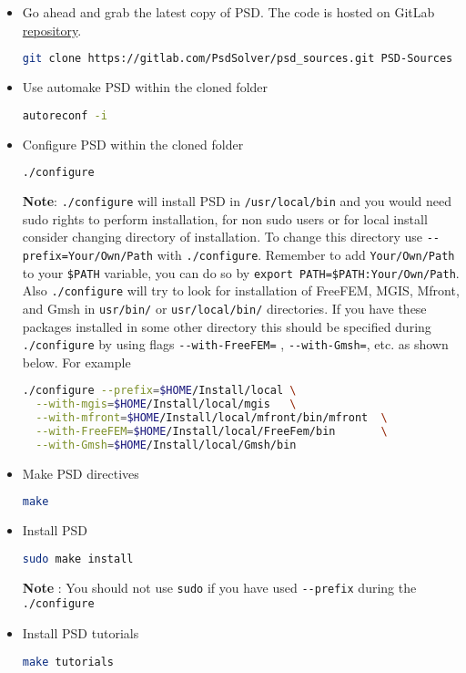\begin{itemize}
\item
  Go ahead and grab the latest copy of PSD. The code is hosted on GitLab
  \href{https://gitlab.com/PsdSolver/psd_sources}{repository}.

\begin{lstlisting}[language=bash]
git clone https://gitlab.com/PsdSolver/psd_sources.git PSD-Sources
\end{lstlisting}
\item
  Use automake PSD within the cloned folder

\begin{lstlisting}[language=bash]
autoreconf -i
\end{lstlisting}
\item
  Configure PSD within the cloned folder

\begin{lstlisting}[language=bash]
./configure
\end{lstlisting}

  \textbf{Note}: \lstinline!./configure! will install PSD in
  \lstinline!/usr/local/bin! and you would need sudo rights to perform
  installation, for non sudo users or for local install consider
  changing directory of installation. To change this directory use
  \lstinline!--prefix=Your/Own/Path! with \lstinline!./configure!.
  Remember to add \lstinline!Your/Own/Path! to your \lstinline!$PATH!
  variable, you can do so by
  \lstinline!export PATH=$PATH:Your/Own/Path!. Also
  \lstinline!./configure! will try to look for installation of FreeFEM,
  MGIS, Mfront, and Gmsh in \lstinline!usr/bin/! or
  \lstinline!usr/local/bin/! directories. If you have these packages
  installed in some other directory this should be specified during
  \lstinline!./configure! by using flags \lstinline!--with-FreeFEM=! ,
  \lstinline!--with-Gmsh=!, etc. as shown below. For example

\begin{lstlisting}[language=bash]
./configure --prefix=$HOME/Install/local \
  --with-mgis=$HOME/Install/local/mgis   \
  --with-mfront=$HOME/Install/local/mfront/bin/mfront  \
  --with-FreeFEM=$HOME/Install/local/FreeFem/bin       \
  --with-Gmsh=$HOME/Install/local/Gmsh/bin        
\end{lstlisting}
\item
  Make PSD directives

\begin{lstlisting}[language=bash]
make
\end{lstlisting}
\item
  Install PSD

\begin{lstlisting}[language=bash]
sudo make install
\end{lstlisting}

  \textbf{Note} : You should not use \lstinline!sudo! if you have used
  \lstinline!--prefix! during the \lstinline!./configure!
\item
  Install PSD tutorials

\begin{lstlisting}[language=bash]
make tutorials
\end{lstlisting}
\end{itemize}

